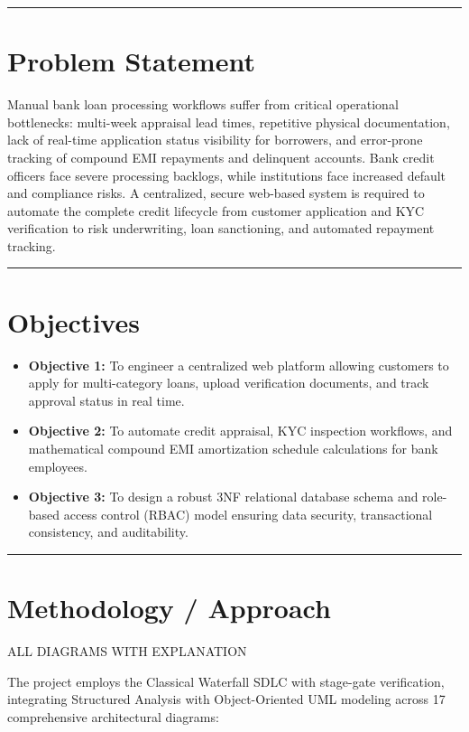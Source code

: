\documentclass[11pt,a4paper]{article}
\newcommand{\divider}{\vspace{1pt}\noindent\rule{\textwidth}{0.5pt}\vspace{3pt}}
\begin{document}
\divider

\section*{Problem Statement}
Manual bank loan processing workflows suffer from critical operational bottlenecks: multi-week appraisal lead times, repetitive physical documentation, lack of real-time application status visibility for borrowers, and error-prone tracking of compound EMI repayments and delinquent accounts. Bank credit officers face severe processing backlogs, while institutions face increased default and compliance risks. A centralized, secure web-based system is required to automate the complete credit lifecycle from customer application and KYC verification to risk underwriting, loan sanctioning, and automated repayment tracking.

\divider

\section*{Objectives}
\begin{itemize}
    \item \textbf{Objective 1:} To engineer a centralized web platform allowing customers to apply for multi-category loans, upload verification documents, and track approval status in real time.
    \item \textbf{Objective 2:} To automate credit appraisal, KYC inspection workflows, and mathematical compound EMI amortization schedule calculations for bank employees.
    \item \textbf{Objective 3:} To design a robust 3NF relational database schema and role-based access control (RBAC) model ensuring data security, transactional consistency, and auditability.
\end{itemize}

\newpage


\noindent\rule{\textwidth}{1.0pt}
\vspace{1pt}

\section*{Methodology / Approach}
ALL DIAGRAMS WITH EXPLANATION\par
The project employs the Classical Waterfall SDLC with stage-gate verification, integrating Structured Analysis with Object-Oriented UML modeling across 17 comprehensive architectural diagrams:
\end{document}
